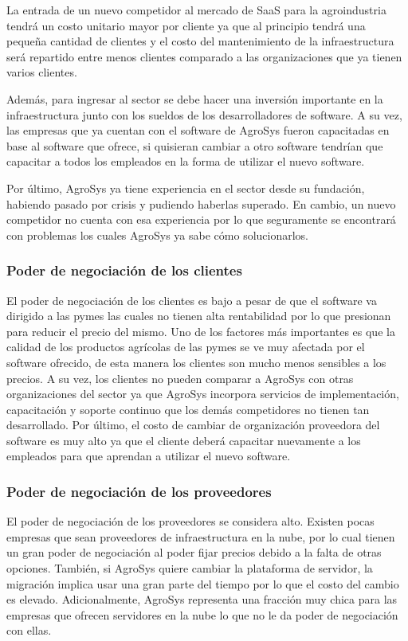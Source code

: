 \documentclass[man,12pt]{apa7}
\begin{document}
La entrada de un nuevo competidor al mercado de SaaS para la agroindustria tendrá un costo unitario mayor por cliente ya que al principio tendrá una pequeña cantidad de clientes y el costo del mantenimiento de la infraestructura será repartido entre menos clientes comparado a las organizaciones que ya tienen varios clientes.

Además, para ingresar al sector se debe hacer una inversión importante en la infraestructura junto con los sueldos de los desarrolladores de software. A su vez, las empresas que ya cuentan con el software de AgroSys fueron capacitadas en base al software que ofrece, si quisieran cambiar a otro software tendrían que capacitar a todos los empleados en la forma de utilizar el nuevo software.

Por último, AgroSys ya tiene experiencia en el sector desde su fundación, habiendo pasado por crisis y pudiendo haberlas superado. En cambio, un nuevo competidor no cuenta con esa experiencia por lo que seguramente se encontrará con problemas los cuales AgroSys ya sabe cómo solucionarlos.

\subsubsection{Poder de negociación de los clientes}

El poder de negociación de los clientes es bajo a pesar de que el software va dirigido a las pymes las cuales no tienen alta rentabilidad por lo que presionan para reducir el precio del mismo. Uno de los factores más importantes es que la calidad de los productos agrícolas de las pymes se ve muy afectada por el software ofrecido, de esta manera los clientes son mucho menos sensibles a los precios. A su vez, los clientes no pueden comparar a AgroSys con otras organizaciones del sector ya que AgroSys incorpora servicios de implementación, capacitación y soporte continuo que los demás competidores no tienen tan desarrollado. Por último, el costo de cambiar de organización proveedora del software es muy alto ya que el cliente deberá capacitar nuevamente a los empleados para que aprendan a utilizar el nuevo software.

\subsubsection{Poder de negociación de los proveedores}

El poder de negociación de los proveedores se considera alto. Existen pocas empresas que sean proveedores de infraestructura en la nube, por lo cual tienen un gran poder de negociación al poder fijar precios debido a la falta de otras opciones. También, si AgroSys quiere cambiar la plataforma de servidor, la migración implica usar una gran parte del tiempo por lo que el costo del cambio es elevado. Adicionalmente, AgroSys representa una fracción muy chica para las empresas que ofrecen servidores en la nube lo que no le da poder de negociación con ellas.
\end{document}
